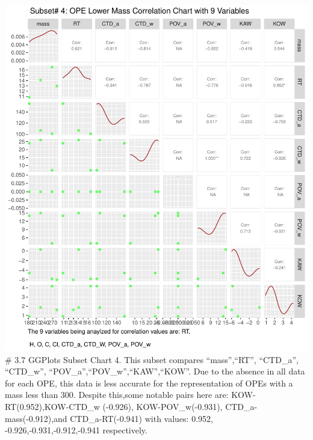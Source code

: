 \documentclass[journal=jacsat,manuscript=article]{achemso}
\begin{document}
\includegraphics{Rahmi_Chowdhury_500621744_Final_project_files/figure-latex/unnamed-chunk-8-1.pdf}
\# 3.7 GGPlots Subset Chart 4. This subset compares ``mass'',``RT'',
``CTD\_a'', ``CTD\_w'', ``POV\_a'',``POV\_w'',``KAW'',``KOW''. Due to
the absence in all data for each OPE, this data is less accurate for the
representation of OPEs with a mass less than 300. Despite this,some
notable pairs here are: KOW-RT(0.952),KOW-CTD\_w (-0.926),
KOW-POV\_w(-0.931), CTD\_a-mass(-0.912),and CTD\_a-RT(-0.941) with
values: 0.952, -0.926,-0.931,-0.912,-0.941 respectively.
\end{document}
